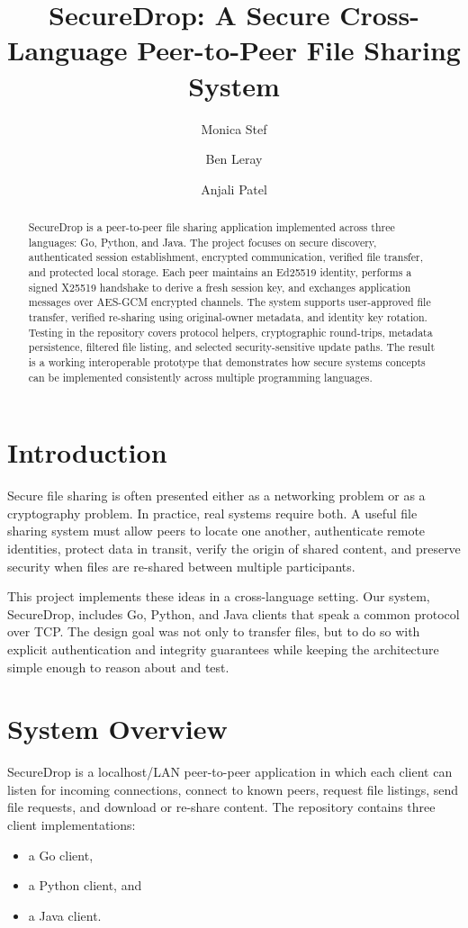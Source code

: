 \documentclass[sigconf,nonacm]{acmart}
\title{SecureDrop: A Secure Cross-Language Peer-to-Peer File Sharing System}
\author{Monica Stef}
\affiliation{%
  \institution{Queen's University}
}
\author{Ben Leray}
\affiliation{%
  \institution{Queen's University}
}
\author{Anjali Patel}
\affiliation{%
  \institution{Queen's University}
}
\begin{document}
\begin{abstract}
SecureDrop is a peer-to-peer file sharing application implemented across
three languages: Go, Python, and Java. The project focuses on secure
discovery, authenticated session establishment, encrypted communication,
verified file transfer, and protected local storage. Each peer maintains
an Ed25519 identity, performs a signed X25519 handshake to derive a fresh
session key, and exchanges application messages over AES-GCM encrypted
channels. The system supports user-approved file transfer, verified
re-sharing using original-owner metadata, and identity key rotation.
Testing in the repository covers protocol helpers, cryptographic
round-trips, metadata persistence, filtered file listing, and selected
security-sensitive update paths. The result is a working interoperable
prototype that demonstrates how secure systems concepts can be implemented
consistently across multiple programming languages.
\end{abstract}


\maketitle

\section{Introduction}
Secure file sharing is often presented either as a networking problem or
as a cryptography problem. In practice, real systems require both. A
useful file sharing system must allow peers to locate one another,
authenticate remote identities, protect data in transit, verify the
origin of shared content, and preserve security when files are re-shared
between multiple participants.

This project implements these ideas in a cross-language setting. Our
system, SecureDrop, includes Go, Python, and Java clients that speak a
common protocol over TCP. The design goal was not only to transfer files,
but to do so with explicit authentication and integrity guarantees while
keeping the architecture simple enough to reason about and test.

\section{System Overview}
SecureDrop is a localhost/LAN peer-to-peer application in which each
client can listen for incoming connections, connect to known peers,
request file listings, send file requests, and download or re-share
content. The repository contains three client implementations:
\begin{itemize}
\item a Go client,
\item a Python client, and
\item a Java client.
\end{itemize}
\end{document}
